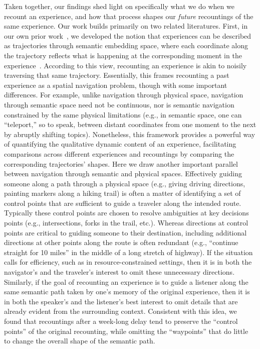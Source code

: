 \documentclass[10pt]{article}
\begin{document}
Taken together, our findings shed light on specifically what we do when we recount an experience, and how that process shapes our \textit{future} recountings of the same experience.
Our work builds primarily on two related literatures.
First, in our own prior work~\citep{HeusEtal21}, we developed the notion that experiences can be described as trajectories through semantic embedding space, where each coordinate along the trajectory reflects what is happening at the corresponding moment in the experience~\citep[also see][]{MannEtal22, FitzEtal26,Mann21a,Mann24}.
According to this view, recounting an experience is akin to noisily traversing that same trajectory.
Essentially, this frames recounting a past experience as a spatial navigation problem, though with some important differences.
For example, unlike navigation through physical space, navigation through semantic space need not be continuous, nor is semantic navigation constrained by the same physical limitations (e.g., in semantic space, one can ``teleport,'' so to speak, between distant coordinates from one moment to the next by abruptly shifting topics).
Nonetheless, this framework provides a powerful way of quantifying the qualitative dynamic content of an experience, facilitating comparisons across different experiences and recountings by comparing the corresponding trajectories' shapes.
Here we draw another important parallel between navigation through semantic and physical spaces.
Effectively guiding someone along a path through a physical space (e.g., giving driving directions, painting markers along a hiking trail) is often a matter of identifying a set of control points that are sufficient to guide a traveler along the intended route.
Typically these control points are chosen to resolve ambiguities at key decisions points (e.g., intersections, forks in the trail, etc.).
Whereas directions at control points are critical to guiding someone to their destination, including additional directions at other points along the route is often redundant (e.g., ``continue straight for 10 miles'' in the middle of a long stretch of highway).
If the situation calls for efficiency, such as in resource-constrained settings, then it is in both the navigator's and the traveler's interest to omit these unnecessary directions.
Similarly, if the goal of recounting an experience is to guide a listener along the same semantic path taken by one's memory of the original experience, then it is in both the speaker's and the listener's best interest to omit details that are already evident from the surrounding context.
Consistent with this idea, we found that recountings after a week-long delay tend to preserve the ``control points'' of the original recounting, while omitting the ``waypoints'' that do little to change the overall shape of the semantic path.
\end{document}
